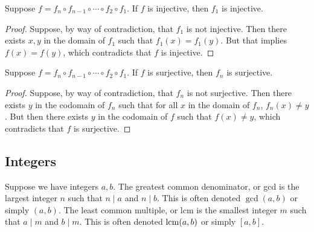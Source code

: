 \begin{theorem}\label{thm:composite-injection}
    Suppose \(f = f_n \circ f_{n-1} \circ \cdots \circ f_2 \circ f_1\).
    If \(f\) is injective, then \(f_1\) is injective.
\end{theorem}
\begin{proof}
    Suppose, by way of contradiction, that \(f_1\) is not injective.
    Then there exists \(x,y\) in the domain of \(f_1\)
    such that \(f_1(x) = f_1(y)\).
    But that implies \(f(x) = f(y)\),
    which contradicts that \(f\) is injective.
\end{proof}
\begin{theorem}\label{thm:composite-surjective}
    Suppose \(f = f_n \circ f_{n-1} \circ \cdots \circ f_2 \circ f_1\).
    If \(f\) is surjective, then \(f_n\) is surjective.
\end{theorem}
\begin{proof}
    Suppose, by way of contradiction, that \(f_n\) is not surjective.
    Then there exists \(y\) in the codomain of \(f_n\)
    such that for all \(x\) in the domain of \(f_n\),
    \(f_n(x) \neq y\).
    But then there exists \(y\) in the codomain of \(f\)
    such that \(f(x) \neq y\),
    which contradicts that \(f\) is surjective.
\end{proof}


\subsection{Integers}

\begin{definition}
    Suppose we have integers \(a,b\).
    The greatest common denominator, or gcd
    is the largest integer \(n\) such that \(n \mid a\) and \(n \mid b\).
    This is often denoted \(\gcd(a,b)\) or simply \((a,b)\).
    The least common multiple, or lcm
    is the smallest integer \(m\) such that \(a \mid m\) and \(b \mid m\).
    This is often denoted \(\operatorname{lcm}(a,b)\) or simply \([a,b]\).
\end{definition}


